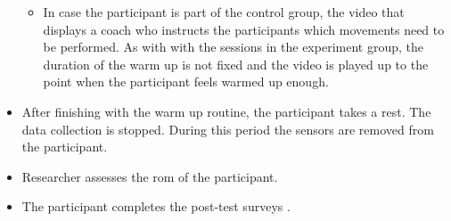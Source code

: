 \begin{itemize}
\begin{itemize}
\item  In case the participant is part of the control group, the video that displays a coach who instructs the participants which movements need to be performed. As with with the sessions in the experiment group, the duration of the warm up is not fixed and the video is played up to the point when the participant feels warmed up enough.\\
\end{itemize}
\item After finishing with the warm up routine, the participant takes a rest. The data collection is stopped. During this period the sensors are removed from the participant. \item Researcher assesses the \acrshort{rom}  of the participant. 
\item The participant completes the post-test surveys . %
\end{itemize}


